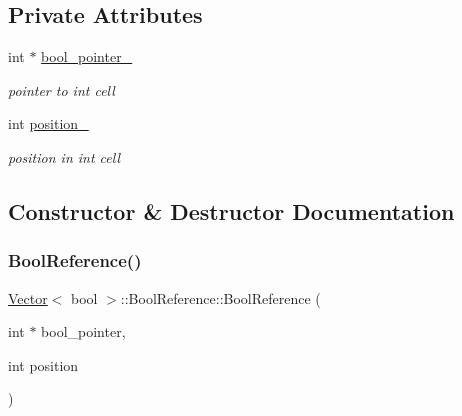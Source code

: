 \subsection*{Private Attributes}
\begin{DoxyCompactItemize}
\item 
\mbox{\label{classVector_3_01bool_01_4_1_1BoolReference_ad9fc66c2a80d7351e5829e321c4d46f0}} 
int $\ast$ \hyperlink{classVector_3_01bool_01_4_1_1BoolReference_ad9fc66c2a80d7351e5829e321c4d46f0}{bool\+\_\+pointer\+\_\+}
\begin{DoxyCompactList}\small\item\em pointer to int cell \end{DoxyCompactList}\item 
\mbox{\label{classVector_3_01bool_01_4_1_1BoolReference_a88f229e6c448c4e7f34381247eb7f2b8}} 
int \hyperlink{classVector_3_01bool_01_4_1_1BoolReference_a88f229e6c448c4e7f34381247eb7f2b8}{position\+\_\+}
\begin{DoxyCompactList}\small\item\em position in int cell \end{DoxyCompactList}\end{DoxyCompactItemize}


\subsection{Constructor \& Destructor Documentation}
\mbox{\label{classVector_3_01bool_01_4_1_1BoolReference_a7b319cb4b874379cbeb6d303b5d323eb}} 
\subsubsection{\texorpdfstring{Bool\+Reference()}{BoolReference()}}
{\footnotesize\ttfamily \hyperlink{classVector}{Vector}$<$ bool $>$\+::Bool\+Reference\+::\+Bool\+Reference (\begin{DoxyParamCaption}\item[{int $\ast$}]{bool\+\_\+pointer,  }\item[{int}]{position }\end{DoxyParamCaption})\hspace{0.3cm}{\ttfamily [inline]}}



